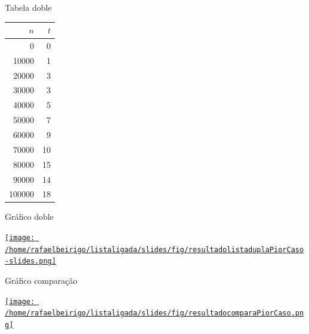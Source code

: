 \documentclass[bigger]{beamer}
\begin{document}
\begin{frame}[label=sec-3-2-5]{Tabela doble}
\begin{center}
\begin{tabular}{rr}
$n$ & $t$\\
\hline
0 & 0\\
10000 & 1\\
20000 & 3\\
30000 & 3\\
40000 & 5\\
50000 & 7\\
60000 & 9\\
70000 & 10\\
80000 & 15\\
90000 & 14\\
100000 & 18\\
\end{tabular}
\end{center}
\end{frame}
\begin{frame}[label=sec-3-2-6]{Gráfico doble}
\begin{center}
\href{fig/resultadolistaduplaPiorCaso-slides.png}{\texttt{[image: /home/rafaelbeirigo/listaligada/slides/fig/resultadolistaduplaPiorCaso-slides.png]}}
\end{center}
\end{frame}
\begin{frame}[label=sec-3-2-7]{Gráfico comparação}
\begin{center}
\href{fig/resultadocomparaPiorCaso.png}{\texttt{[image: /home/rafaelbeirigo/listaligada/slides/fig/resultadocomparaPiorCaso.png]}}
\end{center}
\end{frame}
\end{document}
